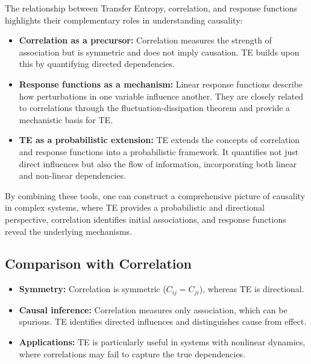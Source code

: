 \documentclass[English, Lau, oneside]{sapthesis}
\begin{document}
\noindent The relationship between Transfer Entropy, correlation, and response functions highlights their complementary roles in understanding causality:
\begin{itemize}
    \item \textbf{Correlation as a precursor:} Correlation measures the strength of association but is symmetric and does not imply causation. TE builds upon this by quantifying directed dependencies.
    \item \textbf{Response functions as a mechanism:} Linear response functions describe how perturbations in one variable influence another. They are closely related to correlations through the fluctuation-dissipation theorem and provide a mechanistic basis for TE.
    \item \textbf{TE as a probabilistic extension:} TE extends the concepts of correlation and response functions into a probabilistic framework. It quantifies not just direct influences but also the flow of information, incorporating both linear and non-linear dependencies.
\end{itemize}

By combining these tools, one can construct a comprehensive picture of causality in complex systems, where TE provides a probabilistic and directional perspective, correlation identifies initial associations, and response functions reveal the underlying mechanisms.

\subsection*{Comparison with Correlation}
\begin{itemize}
    \item \textbf{Symmetry:} Correlation is symmetric (\(C_{ij} = C_{ji}\)), whereas TE is directional.
    \item \textbf{Causal inference:} Correlation measures only association, which can be spurious. TE identifies directed influences and distinguishes cause from effect.
    \item \textbf{Applications:} TE is particularly useful in systems with nonlinear dynamics, where correlations may fail to capture the true dependencies.
\end{itemize}
\end{document}
